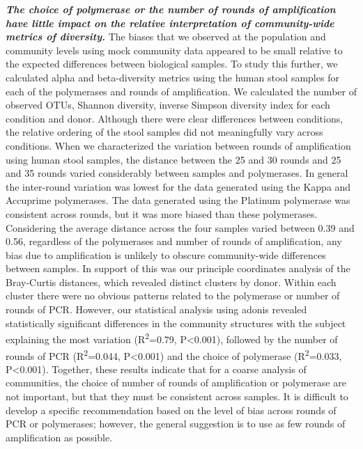 \documentclass[11pt,]{article}
\begin{document}
\textbf{\emph{The choice of polymerase or the number of rounds of
amplification have little impact on the relative interpretation of
community-wide metrics of diversity.}} The biases that we observed at
the population and community levels using mock community data appeared
to be small relative to the expected differences between biological
samples. To study this further, we calculated alpha and beta-diversity
metrics using the human stool samples for each of the polymerases and
rounds of amplification. We calculated the number of observed OTUs,
Shannon diversity, inverse Simpson diversity index for each condition
and donor. Although there were clear differences between conditions, the
relative ordering of the stool samples did not meaningfully vary across
conditions. When we characterized the variation between rounds of
amplification using human stool samples, the distance between the 25 and
30 rounds and 25 and 35 rounds varied considerably between samples and
polymerases. In general the inter-round variation was lowest for the
data generated using the Kappa and Accuprime polymerases. The data
generated using the Platinum polymerase was consistent across rounds,
but it was more biased than these polymerases. Considering the average
distance across the four samples varied between 0.39 and 0.56,
regardless of the polymerases and number of rounds of amplification, any
bias due to amplification is unlikely to obscure community-wide
differences between samples. In support of this was our principle
coordinates analysis of the Bray-Curtis distances, which revealed
distinct clusters by donor. Within each cluster there were no obvious
patterns related to the polymerase or number of rounds of PCR. However,
our statistical analysis using adonis revealed statistically significant
differences in the community structures with the subject explaining the
most variation (R\textsuperscript{2}=0.79, P\textless{}0.001), followed
by the number of rounds of PCR (R\textsuperscript{2}=0.044,
P\textless{}0.001) and the choice of polymerase
(R\textsuperscript{2}=0.033, P\textless{}0.001). Together, these results
indicate that for a coarse analysis of communities, the choice of number
of rounds of amplification or polymerase are not important, but that
they must be consistent across samples. It is difficult to develop a
specific recommendation based on the level of bias across rounds of PCR
or polymerases; however, the general suggestion is to use as few rounds
of amplification as possible.
\end{document}
